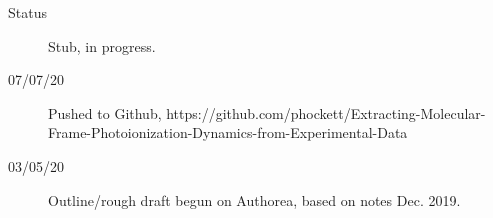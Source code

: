 \begin{description}
\item [{Status}] Stub, in progress.
\item [{07/07/20}] Pushed to Github, https://github.com/phockett/Extracting-Molecular-Frame-Photoionization-Dynamics-from-Experimental-Data

\item [{03/05/20}] Outline/rough draft begun on Authorea, based on notes Dec. 2019.
\end{description}